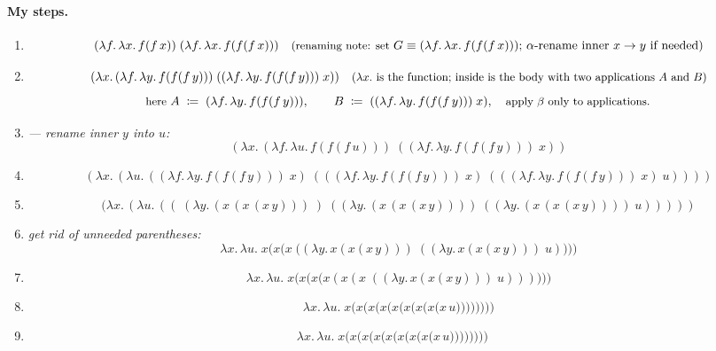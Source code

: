 \documentclass{article}
\theoremstyle{theorem}
\theoremstyle{definition}
\theoremstyle{remark}
\begin{document}
\paragraph{My steps.}

\begin{enumerate}
  \item 
  \[
  (\lambda f.\,\lambda x.\,f(f\,x))\;(\lambda f.\,\lambda x.\,f(f(f\,x)))
  \quad\text{\small(renaming note: set }G \equiv (\lambda f.\,\lambda x.\,f(f(f\,x)))\text{; $\alpha$-rename inner $x\to y$ if needed)}
  \]

  \item 
  \[
  (\lambda x.\,(\lambda f.\,\lambda y.\,f(f(f\,y)))\;((\lambda f.\,\lambda y.\,f(f(f\,y)))\;x))
  \quad\text{\small($\lambda x.$ is the function; inside is the body with two applications $A$ and $B$)}
  \]
  \[
  \text{\small here } 
  A \;\coloneqq\; (\lambda f.\,\lambda y.\,f(f(f\,y))),
  \qquad
  B \;\coloneqq\; ((\lambda f.\,\lambda y.\,f(f(f\,y)))\;x),
  \quad
  \text{\small apply $\beta$ only to applications.}
  \]

  \item \textit{--- rename inner $y$ into $u$:}
  \[
  (\lambda x.\,(\lambda f.\,\lambda u.\,f(f(f\,u)))\;((\lambda f.\,\lambda y.\,f(f(f\,y)))\;x))
  \]

  \item 
  \[
  (\lambda x.\,(\lambda u.\,((\lambda f.\,\lambda y.\,f(f(f\,y)))\;x)\;(((\lambda f.\,\lambda y.\,f(f(f\,y)))\;x)\;(((\lambda f.\,\lambda y.\,f(f(f\,y)))\;x)\;u))))
  \]

  \item 
  \[
  (\lambda x.\,(\lambda u.\,((\;(\lambda y.\,(x\,(x\,(x\,y)))\;)\;((\lambda y.\,(x\,(x\,(x\,y))))\;((\lambda y.\,(x\,(x\,(x\,y))))\;u)))))
  \]

  
  \item \textit{get rid of unneeded parentheses:}
  \[
  \lambda x.\,\lambda u.\;x\big(x\big(x\;\big((\lambda y.\,x(x(x\,y)))\;((\lambda y.\,x(x(x\,y)))\;u)\big)\big)\big)
  \]

  \item 
  \[
  \lambda x.\,\lambda u.\;x\big(x\big(x\big(x(x(x\;((\lambda y.\,x(x(x\,y)))\;u)))\big)\big)\big)
  \]

  \item 
  \[
  \lambda x.\,\lambda u.\;x\big(x\big(x\big(x\big(x\big(x\big(x\big(x\big(x\,u\big)\big)\big)\big)\big)\big)\big)\big)
  \]

  \item 
  \[
  \lambda x.\,\lambda u.\;x\big(x\big(x\big(x\big(x\big(x\big(x\big(x\big(x\,u\big)\big)\big)\big)\big)\big)\big)\big)
  \quad
  \]
\end{enumerate}
\end{document}
